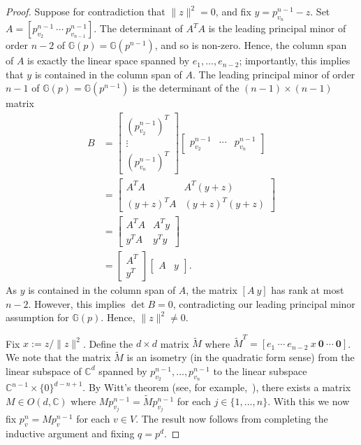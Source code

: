 \documentclass[11pt]{article}
\theoremstyle{definition}
\numberwithin{equation}{section}
\begin{document}
\begin{proof}
	Suppose for contradiction that $\|z\|^2 = 0$,
	and fix $y = p^{n-1}_{v_{n}} - z$.
	Set $A = [p^{n-1}_{v_2} ~ \cdots ~ p^{n-1}_{v_{n-1}}]$.
	The determinant of $A^T A$ is the leading principal minor of order $n-2$ of $\mathbb{G}(p) = \mathbb{G}(p^{n-1})$,
	and so is non-zero.
	Hence, the column span of $A$ is exactly the linear space spanned by $e_1,\ldots, e_{n-2}$;
	importantly,
	this implies that $y$ is contained in the column span of $A$.
	The leading principal minor of order $n-1$ of $\mathbb{G}(p) = \mathbb{G}(p^{n-1})$ is the determinant of the $(n-1) \times (n-1)$ matrix
	\begin{align*}
		B &=		
		\begin{bmatrix}
			(p^{n-1}_{v_2})^T \\
			\vdots \\
			(p^{n-1}_{v_{n}})^T
		\end{bmatrix}
		\begin{bmatrix}
			p^{n-1}_{v_2} & \cdots & p^{n-1}_{v_{n}}
		\end{bmatrix}\\
		&=
		\begin{bmatrix}
			A^T A & A^T (y+z) \\
			(y+z)^T A & (y+z)^T (y+z)
		\end{bmatrix}\\
		&=
		\begin{bmatrix}
			A^T A & A^T y \\
			y^T A & y^T y
		\end{bmatrix}\\
		&= 
		\begin{bmatrix}
			A^T \\
			y^T
		\end{bmatrix}
		\begin{bmatrix}
			A & y
		\end{bmatrix}.
	\end{align*}
	As $y$ is contained in the column span of $A$,
	the matrix $[A ~ y]$ has rank at most $n-2$.
	However, this implies $\det B = 0$,
	contradicting our leading principal minor assumption for $\mathbb{G}(p)$.
	Hence, $\|z\|^2 \neq 0$.
	
	Fix $x := z/\|z\|^2$.
	Define the $d \times d$ matrix $\tilde{M}$ where $\tilde{M}^T = [ e_1 ~ \cdots ~ e_{n-2} ~ x ~ \mathbf{0} ~ \cdots ~ \mathbf{0}]$.
	We note that the matrix $\tilde{M}$ is an isometry (in the quadratic form sense) from the linear subspace of $\mathbb{C}^d$ spanned by $p^{n-1}_{v_2},\ldots, p^{n-1}_{v_{n}}$ to the linear subspace $\mathbb{C}^{n-1} \times \{0\}^{d-n+1}$.
	By Witt's theorem (see, for example,~\cite[Theorem 11.15]{roman}),
	there exists a matrix $M \in O(d, \mathbb{C})$ where $Mp^{n-1}_{v_j} = \tilde{M}p^{n-1}_{v_j}$ for each $j \in \{1,\ldots,n\}$.
	With this we now fix $p^n_v = Mp^{n-1}_v$ for each $v \in V$.
	The result now follows from completing the inductive argument and fixing $q = p^d$.
\end{proof}
\end{document}
